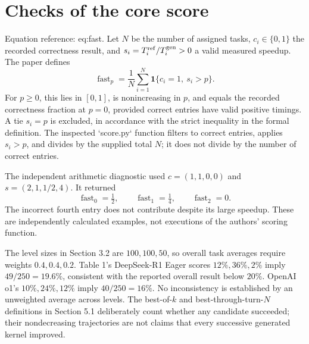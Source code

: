 \documentclass[10pt]{article}
\begin{document}
\section*{Checks of the core score}
Equation reference: eq:fast. Let \(N\) be the number of assigned tasks, \(c_i\in\{0,1\}\) the recorded correctness result, and \(s_i=T_i^{\rm ref}/T_i^{\rm gen}>0\) a valid measured speedup. The paper defines \[\operatorname{fast}_p=\frac1N\sum_{i=1}^{N}
 \mathbf1\{c_i=1,\ s_i>p\}.
 \] For \(p\ge0\), this lies in \([0,1]\), is nonincreasing in \(p\), and equals the recorded correctness fraction at \(p=0\), provided correct entries have valid positive timings. A tie \(s_i=p\) is excluded, in accordance with the strict inequality in the formal definition. The inspected `score.py` function filters to correct entries, applies \(s_i>p\), and divides by the supplied total \(N\); it does not divide by the number of correct entries.\par
The independent arithmetic diagnostic used \(c=(1,1,0,0)\) and \(s=(2,1,1/2,4)\). It returned \[\operatorname{fast}_0=\tfrac12,\qquad
 \operatorname{fast}_1=\tfrac14,\qquad
 \operatorname{fast}_2=0.\] The incorrect fourth entry does not contribute despite its large speedup. These are independently calculated examples, not executions of the authors’ scoring function.\par
The level sizes in Section 3.2 are \(100,100,50\), so overall task averages require weights \(0.4,0.4,0.2\). Table 1’s DeepSeek-R1 Eager scores \(12\%,36\%,2\%\) imply \(49/250=19.6\%\), consistent with the reported overall result below \(20\%\). OpenAI o1’s \(10\%,24\%,12\%\) imply \(40/250=16\%\). No inconsistency is established by an unweighted average across levels. The best-of-\(k\) and best-through-turn-\(N\) definitions in Section 5.1 deliberately count whether any candidate succeeded; their nondecreasing trajectories are not claims that every successive generated kernel improved.\par
\end{document}

